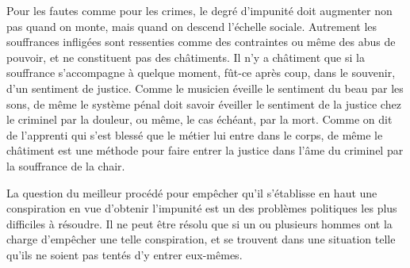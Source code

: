 \documentclass[french,twoside]{book} %
\begin{document}
Pour les fautes comme pour les crimes, le degré d'impunité doit augmenter non pas quand on monte, mais quand on descend l'échelle sociale. Autrement les souffrances infligées sont ressenties comme des contraintes ou même des abus de pouvoir, et ne constituent pas des châtiments. Il n'y a châtiment que si la souffrance s'accompagne à quelque moment, fût-ce après coup, dans le souvenir, d'un sentiment de justice. Comme le musicien éveille le sentiment du beau par les sons, de même le système pénal doit savoir éveiller le sentiment de la justice chez le criminel par la douleur, ou même, le cas échéant, par la mort. Comme on dit de l'apprenti qui s'est blessé que le métier lui entre dans le corps, de même le châtiment est une méthode pour faire entrer la justice dans l'âme du criminel par la souffrance de la chair.\par
La question du meilleur procédé pour empêcher qu'il s'établisse en haut une conspiration en vue d'obtenir l'impunité est un des problèmes politiques les plus difficiles à résoudre. Il ne peut être résolu que si un ou plusieurs hommes ont la charge d'empêcher une telle conspiration, et se trouvent dans une situation telle qu'ils ne soient pas tentés d'y entrer eux-mêmes.
\end{document}
